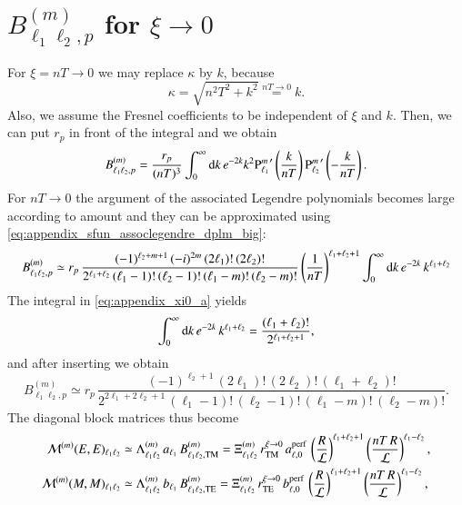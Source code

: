 \section{$B_{\ell_1 \ell_2,p}^{(m)}$ for $\xi\to0$}

\label{appendix_integral}

For $\xi=nT\to0$ we may replace $\kappa$ by $k$, because
\begin{equation}
\kappa = \sqrt{n^2T^2+k^2} \overset{nT\to0}{=} k.
\end{equation}
Also, we assume the Fresnel coefficients to be independent of $\xi$ and $k$.
Then, we can put $r_p$ in front of the integral and we obtain
\begin{equation}
B_{\ell_1 \ell_2,p}^{(m)} = \frac{r_p}{(nT)^3} \int_0^\infty \mathrm{d}k \, e^{-2k} k^2 {\text{P}_{\ell_1}^{m}}^\prime\left(\frac{k}{nT}\right){\text{P}_{\ell_2}^{m}}^\prime\left(-\frac{k}{nT}\right).
\end{equation}
For $nT\to0$ the argument of the associated Legendre polynomials becomes large
according to amount and they can be approximated using
\eqref{eq:appendix_sfun_assoclegendre_dplm_big}:
\begin{equation}
\label{eq:appendix_xi0_a}
B_{\ell_1 \ell_2,p}^{(m)} \simeq r_p \, \frac{(-1)^{\ell_2+m+1}\,(-i)^{2m}\,(2\ell_1)!\,(2\ell_2)!}{2^{\ell_1+\ell_2} \, (\ell_1-1)! \, (\ell_2-1)! \, (\ell_1-m)! \, (\ell_2-m)!}
\left(\frac{1}{nT}\right)^{\ell_1+\ell_2+1} \int_0^\infty \mathrm{d}k \, e^{-2k} \, k^{\ell_1+\ell_2}
\end{equation}
The integral in \eqref{eq:appendix_xi0_a} yields
\begin{equation}
\int_0^\infty \mathrm{d}k \, e^{-2k} \, k^{\ell_1+\ell_2} = \frac{(\ell_1+\ell_2)!}{2^{\ell_1+\ell_2+1}},
\end{equation}
and after inserting we obtain
\begin{equation}
B_{\ell_1 \ell_2,p}^{(m)} \simeq r_p \, \frac{(-1)^{\ell_2+1} \, (2\ell_1)! \, (2\ell_2)! \, (\ell_1+\ell_2)!}{2^{2\ell_1+2\ell_2+1} \, (\ell_1-1)! \, (\ell_2-1)! \, (\ell_1-m)! \, (\ell_2-m)!}.
\end{equation}
The diagonal block matrices thus become
\begin{align}
\label{eq:appendix_integration_EE}
\mathcal{M}^{(m)}(E,E)_{\ell_1 \ell_2} &\simeq \Lambda_{\ell_1 \ell_2}^{(m)} \, a_{\ell_1} \, B_{\ell_1 \ell_2, \mathrm{TM}}^{(m)} = \Xi_{\ell_1 \ell_2}^{(m)} \, r_{\mathrm{TM}}^{\xi\to0} \, a_{\ell,0}^\text{perf} \, \left(\frac{R}{\mathcal{L}}\right)^{\ell_1+\ell_2+1} \left(\frac{nT \, R}{\mathcal{L}}\right)^{\ell_1-\ell_2}, \\
\label{eq:appendix_integration_MM}
\mathcal{M}^{(m)}(M,M)_{\ell_1 \ell_2} &\simeq \Lambda_{\ell_1 \ell_2}^{(m)} \, b_{\ell_1} \, B_{\ell_1 \ell_2, \mathrm{TE}}^{(m)} = \Xi_{\ell_1 \ell_2}^{(m)} \, r_{\mathrm{TE}}^{\xi\to0} \, b_{\ell,0}^\text{perf} \, \left(\frac{R}{\mathcal{L}}\right)^{\ell_1+\ell_2+1} \left(\frac{nT \, R}{\mathcal{L}}\right)^{\ell_1-\ell_2},
\end{align}
